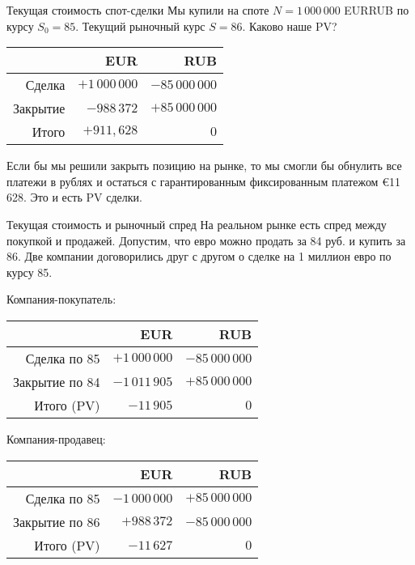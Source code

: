 \documentclass{beamer}
\renewcommand{\EUR}[1]{\textup{\euro}#1}
\begin{document}
\begin{frame}{Текущая стоимость спот-сделки}
\justify
Мы купили на споте $N=1\,000\,000$ EURRUB по курсу $S_0 = 85$. Текущий рыночный курс $S=86$. Каково наше PV?

\justify
\centering
\begin{tabular}{r|r|r}
         & EUR               & RUB \\ \hline
Сделка   & $+1\,000\,000$ & $-85\,000\,000$ \\
Закрытие &    $-988\,372$ & $+85\,000\,000$ \\ \hline
Итого    &      $+911,628$ & $0$
\end{tabular}

\justify
Если бы мы решили закрыть позицию на рынке, то мы смогли бы обнулить все платежи в рублях и остаться с гарантированным фиксированным платежом \EUR{11\,628}. Это и есть PV сделки.
\end{frame}



\begin{frame}{Текущая стоимость и рыночный спред}
\justify
На реальном рынке есть спред между покупкой и продажей. Допустим, что евро можно продать за 84 руб. и купить за 86. Две компании договорились друг с другом о сделке на 1 миллион евро по курсу 85.

\justify
Компания-покупатель:

\centering
\begin{tabular}{r|r|r}
                & EUR                   & RUB \\ \hline
Сделка по 85   & $+1\,000\,000$ & $-85\,000\,000$ \\
Закрытие по 84 & $-1\,011\,905$ & $+85\,000\,000$ \\ \hline
Итого (PV)      &      $-11\,905$ & $0$
\end{tabular}

\justify
Компания-продавец:

\centering
\begin{tabular}{r|r|r}
                 & EUR                   & RUB \\ \hline
Сделка по 85     & $-1\,000\,000$ & $+85\,000\,000$ \\
Закрытие по 86   &    $+988\,372$ & $-85\,000\,000$ \\ \hline
Итого (PV)       &      $-11\,627$ & $0$
\end{tabular} 
\end{frame}
\end{document}
